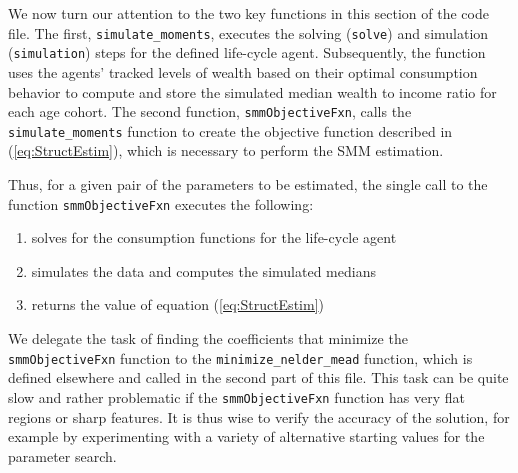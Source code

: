 \documentclass[titlepage, headings=optiontotocandhead]{econark}
\begin{document}
{We now turn our attention to the two key functions in this section of the code file. The first, \texttt{simulate\_moments}, executes the solving (\texttt{solve}) and simulation (\texttt{simulation}) steps for the defined life-cycle agent.  Subsequently, the function uses the agents' tracked levels of wealth based on their optimal consumption behavior to compute and store the simulated median wealth to income ratio for each age cohort. The second function, \texttt{smmObjectiveFxn}, calls the \texttt{simulate\_moments} function to create the objective function described in (\ref{eq:StructEstim}), which is necessary to perform the SMM estimation.


% 

Thus, for a given pair of the parameters to be estimated, the single
call to the function \texttt{smmObjectiveFxn} executes the following:
\begin{enumerate}
\item solves for the consumption functions for the life-cycle agent
\item simulates the data and computes the simulated medians
\item returns the value of equation (\ref{eq:StructEstim})
\end{enumerate}

We delegate the task of finding the coefficients that minimize the \texttt{smmObjectiveFxn} function to the \texttt{minimize\_nelder\_mead} function, which is defined elsewhere and called in the second part of this file.  This task can be quite slow and rather problematic if the \texttt{smmObjectiveFxn} function has very flat regions or sharp features. It is thus wise to verify the accuracy of the solution, for example by experimenting with a variety of alternative starting values for the parameter search.

}
\end{document}
